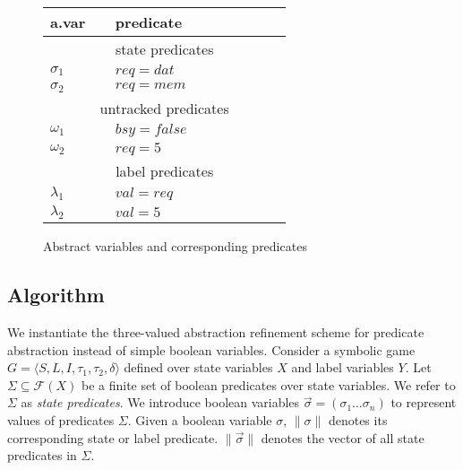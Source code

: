 \documentclass{book}
\newcommand{\forms}[0]{\mathcal{F}}
\newcommand{\vect}[1]{\vec{#1}}
\theoremstyle{definition}
\begin{document}
\begin{figure}
    \caption{Abstract variables and corresponding predicates}
    \begin{tabular}{|p{0.14\linewidth}|p{0.5\linewidth}|}
        \hline
        {\bf a.var} & {\bf predicate} \\
        \hline\hline
        \multicolumn{2}{|c|}{state predicates} \\
        \hline
        $\sigma_1$ & $req=dat$   \\
        $\sigma_2$ & $req=mem$   \\
        \hline\hline
        \multicolumn{2}{|c|}{untracked predicates} \\
        \hline
        $\omega_1$ & $bsy=false$ \\
        $\omega_2$ & $req=5$     \\
        \hline\hline
        \multicolumn{2}{|c|}{label predicates} \\
        \hline
        $\lambda_1$ & $val=req$  \\
        $\lambda_2$ & $val=5$    \\
        \hline
    \end{tabular}
\end{figure}

\subsection{Algorithm}

We instantiate the three-valued abstraction refinement scheme for predicate abstraction instead of simple boolean variables. Consider a symbolic game $G = \langle S, L, I, \tau_1, \tau_2, \delta \rangle$ defined over state variables $X$ and label variables $Y$. Let $\Sigma\subseteq\forms(X)$ be a finite set of boolean predicates over state variables. We refer to $\Sigma$ as \emph{state predicates}. We introduce boolean variables $\vect{\sigma}=(\sigma_1\ldots\sigma_n)$ to represent values of predicates $\Sigma$. Given a boolean variable $\sigma$, $\|\sigma\|$ denotes its corresponding state or label predicate. $\|\vect{\sigma}\|$ denotes the vector of all state predicates in $\Sigma$.

\end{document}
